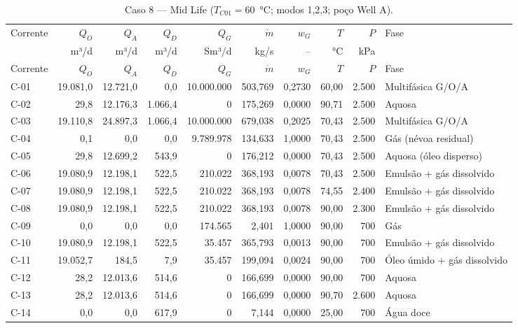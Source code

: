 \documentclass[11pt,a4paper]{article}
\numberwithin{equation}{section}
\numberwithin{table}{section}
\numberwithin{figure}{section}
\begin{document}
{\footnotesize\setlength{\tabcolsep}{3pt}\begin{longtable}{lrrrrrrrrL{2.5cm}}
\caption{Caso 8 --- Mid Life ($T_{C01}=60$~°C; modos 1,2,3; poço Well A).}\\\toprule
Corrente & $Q_O$ & $Q_A$ & $Q_D$ & $Q_G$ & $\dot m$ & $w_G$ & $T$ & $P$ & Fase\\ & m³/d & m³/d & m³/d & Sm³/d & kg/s & -- & °C & kPa & \\\midrule\endfirsthead
\toprule Corrente & $Q_O$ & $Q_A$ & $Q_D$ & $Q_G$ & $\dot m$ & $w_G$ & $T$ & $P$ & Fase\\\midrule\endhead
C-01 & 19.081,0 & 12.721,0 & 0,0 & 10.000.000 & 503,769 & 0,2730 & 60,00 & 2.500 & {\scriptsize Multifásica G/O/A}\\
C-02 & 29,8 & 12.176,3 & 1.066,4 & 0 & 175,269 & 0,0000 & 90,71 & 2.500 & {\scriptsize Aquosa}\\
C-03 & 19.110,8 & 24.897,3 & 1.066,4 & 10.000.000 & 679,038 & 0,2025 & 70,43 & 2.500 & {\scriptsize Multifásica G/O/A}\\
C-04 & 0,1 & 0,0 & 0,0 & 9.789.978 & 134,633 & 1,0000 & 70,43 & 2.500 & {\scriptsize Gás (névoa residual)}\\
C-05 & 29,8 & 12.699,2 & 543,9 & 0 & 176,212 & 0,0000 & 70,43 & 2.500 & {\scriptsize Aquosa (óleo disperso)}\\
C-06 & 19.080,9 & 12.198,1 & 522,5 & 210.022 & 368,193 & 0,0078 & 70,43 & 2.500 & {\scriptsize Emulsão + gás dissolvido}\\
C-07 & 19.080,9 & 12.198,1 & 522,5 & 210.022 & 368,193 & 0,0078 & 74,55 & 2.400 & {\scriptsize Emulsão + gás dissolvido}\\
C-08 & 19.080,9 & 12.198,1 & 522,5 & 210.022 & 368,193 & 0,0078 & 90,00 & 2.300 & {\scriptsize Emulsão + gás dissolvido}\\
C-09 & 0,0 & 0,0 & 0,0 & 174.565 & 2,401 & 1,0000 & 90,00 & 700 & {\scriptsize Gás}\\
C-10 & 19.080,9 & 12.198,1 & 522,5 & 35.457 & 365,793 & 0,0013 & 90,00 & 700 & {\scriptsize Emulsão + gás dissolvido}\\
C-11 & 19.052,7 & 184,5 & 7,9 & 35.457 & 199,094 & 0,0024 & 90,00 & 700 & {\scriptsize Óleo úmido + gás dissolvido}\\
C-12 & 28,2 & 12.013,6 & 514,6 & 0 & 166,699 & 0,0000 & 90,00 & 700 & {\scriptsize Aquosa}\\
C-13 & 28,2 & 12.013,6 & 514,6 & 0 & 166,699 & 0,0000 & 90,70 & 2.600 & {\scriptsize Aquosa}\\
C-14 & 0,0 & 0,0 & 617,9 & 0 & 7,144 & 0,0000 & 25,00 & 700 & {\scriptsize Água doce}\\

\end{longtable}}
\end{document}
